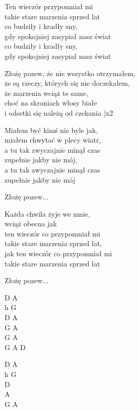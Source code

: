 \begin{text}    
    Ten wieczór przypomniał mi\\
    takie stare marzenia sprzed lat\\
    co budziły i kradły sny,\\
    gdy spokojniej zasypiał nasz świat\\
    co budziły i kradły sny,\\
    gdy spokojniej zasypiał nasz świat

    \vin Złożę pozew, że nie wszystko otrzymałem,\\
    \vin że są rzeczy, których się nie doczekałem,\\
    \vin że marzenia wciąż te same,\\
    \vin choć na skroniach włosy białe\\ 
    \vin i odsetki się należą od czekania |x2

    Miałem być kimś nie byle jak,\\
    miałem chwytać w plecy wiatr,\\
    a tu tak zwyczajnie minął czas\\
    zupełnie jakby nie mój,\\
    a tu tak zwyczajnie minął czas\\
    zupełnie jakby nie mój

    \vin Złożę pozew...

    Każda chwila żyje we mnie,\\
    wciąż obecna jak\\
    ten wieczór co przypomniał mi \\
    takie stare marzenia sprzed lat,\\
    jak ten wieczór co przypomniał mi \\
    takie stare marzenia sprzed lat

    \vin Złożę pozew...
\end{text}
\begin{chord}
    D A \\
    h G \\
    D A \\
    G A \\
    G A \\
    G A D 

    D A\\
    h G\\ 
    D\\
    A\\
    G A
\end{chord}
